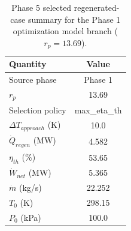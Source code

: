 \begin{table}[htbp]
    \centering
    \caption{Phase 5 selected regenerated-case summary for the Phase 1 optimization model branch ($r_p = 13.69$).}
    \label{tab:phase5_selected_case_summary_phase1_optimization}
    \begin{tabular}{lc}
        \hline
        Quantity & Value \\
        \hline
        Source phase & Phase 1 \\
        $r_p$ & 13.69 \\
        Selection policy & max_eta_th \\
        $\Delta T_{approach}$ (K) & 10.0 \\
        $\dot{Q}_{regen}$ (MW) & 4.582 \\
        $\eta_{th}$ (\%) & 53.65 \\
        $\dot{W}_{net}$ (MW) & 5.365 \\
        $\dot{m}$ (kg/s) & 22.252 \\
        $T_0$ (K) & 298.15 \\
        $P_0$ (kPa) & 100.0 \\
        \hline
    \end{tabular}
\end{table}